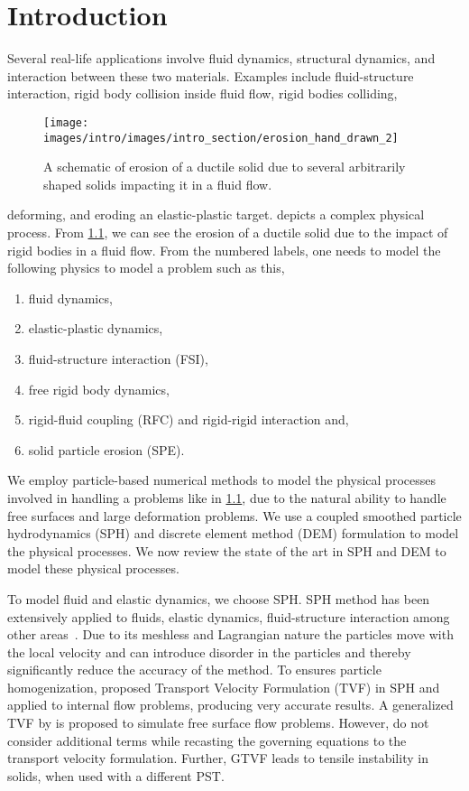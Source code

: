 \chapter{Introduction}
\label{chap:intro}
Several real-life applications involve fluid dynamics, structural dynamics, and
interaction between these two materials. Examples include fluid-structure
interaction, rigid body collision inside fluid flow, rigid bodies colliding,
\begin{figure}[!htpb]
  \centering
  \texttt{[image: images/intro/images/intro\_section/erosion\_hand\_drawn\_2]}
  \caption{A schematic of erosion of a ductile solid due to several arbitrarily
    shaped solids impacting it in a fluid flow.}
\label{fig:intro-big-picture}
\end{figure}
deforming, and eroding an elastic-plastic target. 
depicts a complex physical process. From \cref{fig:intro-big-picture}, we can
see the erosion of a ductile solid due to the impact of rigid bodies in a fluid
flow. From the numbered labels, one needs to model the following physics to
model a problem such as this,
\begin{enumerate}
\item fluid dynamics,
\item elastic-plastic dynamics,
\item fluid-structure interaction (FSI),
\item free rigid body dynamics,
\item rigid-fluid coupling (RFC) and rigid-rigid interaction and,
\item solid particle erosion (SPE).
\end{enumerate}
We employ particle-based numerical methods to model the physical processes
involved in handling a problems like in \cref{fig:intro-big-picture}, due to the
natural ability to handle free surfaces and large deformation problems. We use a coupled
smoothed particle hydrodynamics (SPH) and discrete element method (DEM)
formulation to model the physical processes. We now review the state of the art
in SPH and DEM to model these physical processes.


To model fluid and elastic dynamics, we choose SPH. SPH method has been
extensively applied to fluids, elastic dynamics, fluid-structure interaction
among other areas~\parencite{monaghan2012smoothed}. Due to its meshless and
Lagrangian nature the particles move with the local velocity and can introduce
disorder in the particles and thereby significantly reduce the accuracy of the
method. To ensures particle homogenization, \textcite{Adami2013} proposed
Transport Velocity Formulation (TVF) in SPH and applied to internal flow
problems, producing very accurate results. A generalized TVF by
\textcite{zhang_hu_adams17} is proposed to simulate free surface flow problems.
However, \textcite{Adami2013,zhang_hu_adams17} do not consider additional terms
while recasting the governing equations to the transport velocity formulation.
Further, GTVF leads to tensile instability in solids, when used with a different
PST.


